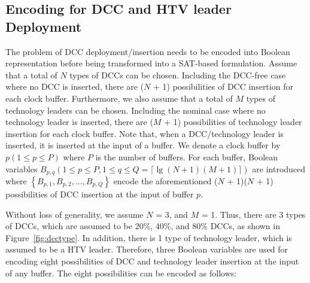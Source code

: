 \subsection{Encoding for DCC and HTV leader Deployment}
\label{subsec:eddcd}
The problem of DCC deployment/insertion needs to be encoded into Boolean representation before being transformed into a SAT-based formulation. Assume that a total of $N$ types of DCCs can be chosen. Including the DCC-free case where no DCC is inserted, there are ($N$ + 1) possibilities of DCC insertion for each clock buffer. Furthermore, we also assume that a total of $M$ types of technology leaders can be chosen. Including the nominal case where no technology leader is inserted, there are ($M$ + 1) possibilities of technology leader insertion for each clock buffer. Note that, when a DCC/technology leader is inserted, it is inserted at the input of a buffer. We denote a clock buffer by $p\left(1 \leq p \leq P\right)$ where $P$ is the number of buffers. For each buffer, Boolean variables $B_{p,q}\left(1 \leq p \leq P, 1 \leq q \leq Q = \lceil \lg (N + 1)(M + 1)\rceil \right)$ are introduced where $\left\{B_{p,1}, B_{p,2},\dotsc, B_{p,Q}\right\}$ encode the aforementioned ($N$ + 1)($N$ + 1) possibilities of DCC insertion at the input of buffer $p$.


Without loss of generality, we assume $N$ = 3, and $M$ = 1. Thus, there are 3 types of DCCs, which are assumed to be 20\%, 40\%, and 80\% DCCs, as shown in Figure~\ref{fig:dcctype}. In addition, there is 1 type of technology leader, which is assumed to be a HTV leader. Therefore, three Boolean variables are used for encoding eight possibilities of DCC and technology leader insertion at the input of any buffer. The eight possibilities can be encoded as follows:\newline

